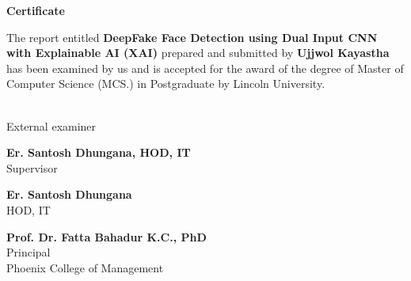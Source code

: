 \pagestyle{plain}
\vspace*{52pt}
\begin{center}
    \large{\textbf{Certificate}}\\[31pt]
\end{center}

The report entitled \textbf{DeepFake Face Detection using  Dual Input CNN with Explainable AI (XAI)} prepared and submitted by \textbf{Ujjwol Kayastha} has been examined by us and is accepted for the award of the degree of Master of Computer Science (MCS.) in Postgraduate by Lincoln University.


\vspace{73pt}

\noindent
\textbf{} \\
External examiner

\vspace{2cm}

\noindent
\textbf{Er. Santosh Dhungana, HOD, IT} \\
Supervisor

\vspace{2cm}

\noindent
\textbf{Er. Santosh Dhungana} \\
HOD, IT

\vspace{2cm}

\noindent
\textbf{Prof. Dr. Fatta Bahadur K.C., PhD} \\
Principal \\
Phoenix College of Management

